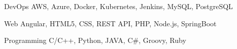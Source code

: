 

\begin{cvskills}

  \cvskill
    {DevOps} %
    {AWS, Azure, Docker, Kubernetes, Jenkins, MySQL, PostgreSQL} %

  \cvskill
    {Web} %
    {Angular, HTML5, CSS, REST API, PHP, Node.js, SpringBoot} %

  \cvskill
    {Programming} %
    {C/C++, Python, JAVA, C\#, Groovy, Ruby} %

\end{cvskills}
